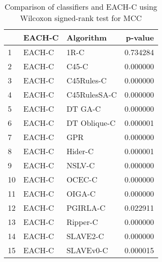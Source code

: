 \begin{table}
\footnotesize
\caption{Comparison of classifiers and EACH-C using Wilcoxon signed-rank test for MCC}
\label{tab:EACH-C wilcoxon MCC comparison}
\begin{tabular}{lllr}
\hline
 & EACH-C & Algorithm & p-value \\
\hline
1 & EACH-C & 1R-C & 0.734284 \\
2 & EACH-C & C45-C & 0.000000 \\
3 & EACH-C & C45Rules-C & 0.000000 \\
4 & EACH-C & C45RulesSA-C & 0.000000 \\
5 & EACH-C & DT GA-C & 0.000000 \\
6 & EACH-C & DT Oblique-C & 0.000001 \\
7 & EACH-C & GPR & 0.000000 \\
8 & EACH-C & Hider-C & 0.000001 \\
9 & EACH-C & NSLV-C & 0.000000 \\
10 & EACH-C & OCEC-C & 0.000000 \\
11 & EACH-C & OIGA-C & 0.000000 \\
12 & EACH-C & PGIRLA-C & 0.022911 \\
13 & EACH-C & Ripper-C & 0.000000 \\
14 & EACH-C & SLAVE2-C & 0.000000 \\
15 & EACH-C & SLAVEv0-C & 0.000015 \\
\hline
\end{tabular}
\end{table}
